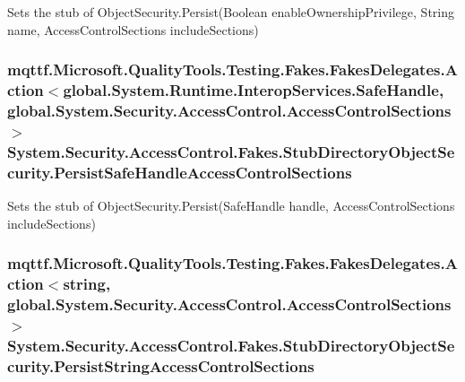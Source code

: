 Sets the stub of Object\-Security.\-Persist(\-Boolean enable\-Ownership\-Privilege, String name, Access\-Control\-Sections include\-Sections)

\hypertarget{class_system_1_1_security_1_1_access_control_1_1_fakes_1_1_stub_directory_object_security_ab9c6e37c1fbd2f100689ab2eab2d72cc}{
\subsubsection[{Persist\-Safe\-Handle\-Access\-Control\-Sections}]{\setlength{\rightskip}{0pt plus 5cm}mqttf.\-Microsoft.\-Quality\-Tools.\-Testing.\-Fakes.\-Fakes\-Delegates.\-Action$<$global.\-System.\-Runtime.\-Interop\-Services.\-Safe\-Handle, global.\-System.\-Security.\-Access\-Control.\-Access\-Control\-Sections$>$ System.\-Security.\-Access\-Control.\-Fakes.\-Stub\-Directory\-Object\-Security.\-Persist\-Safe\-Handle\-Access\-Control\-Sections}}\label{class_system_1_1_security_1_1_access_control_1_1_fakes_1_1_stub_directory_object_security_ab9c6e37c1fbd2f100689ab2eab2d72cc}


Sets the stub of Object\-Security.\-Persist(\-Safe\-Handle handle, Access\-Control\-Sections include\-Sections)

\hypertarget{class_system_1_1_security_1_1_access_control_1_1_fakes_1_1_stub_directory_object_security_a11bbaf59fc499a91374f3978f8b3fda3}{
\subsubsection[{Persist\-String\-Access\-Control\-Sections}]{\setlength{\rightskip}{0pt plus 5cm}mqttf.\-Microsoft.\-Quality\-Tools.\-Testing.\-Fakes.\-Fakes\-Delegates.\-Action$<$string, global.\-System.\-Security.\-Access\-Control.\-Access\-Control\-Sections$>$ System.\-Security.\-Access\-Control.\-Fakes.\-Stub\-Directory\-Object\-Security.\-Persist\-String\-Access\-Control\-Sections}}\label{class_system_1_1_security_1_1_access_control_1_1_fakes_1_1_stub_directory_object_security_a11bbaf59fc499a91374f3978f8b3fda3}


